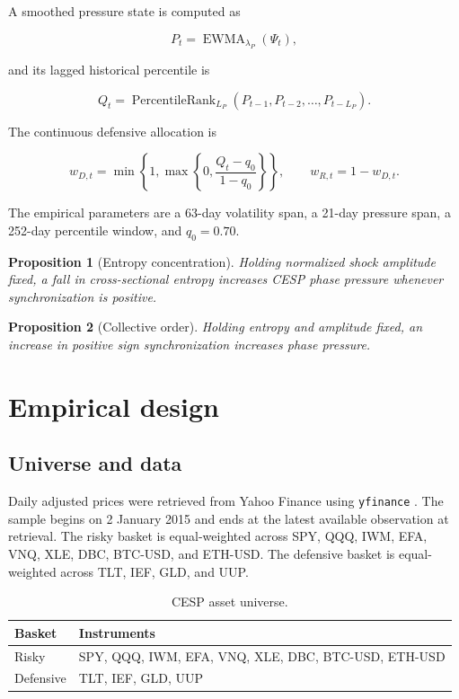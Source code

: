 \documentclass[11pt]{article}
\newtheorem{proposition}{Proposition}
\begin{document}
A smoothed pressure state is computed as

\begin{equation}
P_t=\operatorname{EWMA}_{\lambda_P}(\Psi_t),
\end{equation}

and its lagged historical percentile is

\begin{equation}
Q_t=
\operatorname{PercentileRank}_{L_P}
(P_{t-1},P_{t-2},\ldots,P_{t-L_P}).
\end{equation}

The continuous defensive allocation is

\begin{equation}
w_{D,t}=
\min\left\{
1,
\max\left\{
0,
\frac{Q_t-q_0}{1-q_0}
\right\}
\right\},
\qquad
w_{R,t}=1-w_{D,t}.
\end{equation}

The empirical parameters are a 63-day volatility span, a 21-day pressure span,
a 252-day percentile window, and $q_0=0.70$.

\begin{proposition}[Entropy concentration]
Holding normalized shock amplitude fixed, a fall in cross-sectional entropy
increases CESP phase pressure whenever synchronization is positive.
\end{proposition}

\begin{proposition}[Collective order]
Holding entropy and amplitude fixed, an increase in positive sign synchronization
increases phase pressure.
\end{proposition}

\section{Empirical design}

\subsection{Universe and data}

Daily adjusted prices were retrieved from Yahoo Finance using \texttt{yfinance}
\citep{yfinance}. The sample begins on 2 January 2015 and ends at the latest
available observation at retrieval. The risky basket is equal-weighted across
SPY, QQQ, IWM, EFA, VNQ, XLE, DBC, BTC-USD, and ETH-USD. The defensive basket
is equal-weighted across TLT, IEF, GLD, and UUP.

\begin{table}[H]
\centering
\caption{CESP asset universe.}
\begin{tabular}{ll}
\toprule
Basket & Instruments\\
\midrule
Risky & SPY, QQQ, IWM, EFA, VNQ, XLE, DBC, BTC-USD, ETH-USD\\
Defensive & TLT, IEF, GLD, UUP\\
\bottomrule
\end{tabular}
\end{table}
\end{document}
